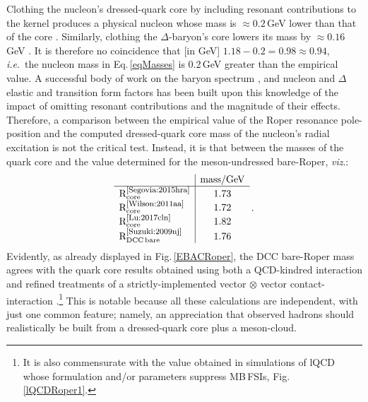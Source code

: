 Clothing the nucleon's dressed-quark core by including resonant contributions to the kernel produces a physical nucleon whose mass is $\approx 0.2$\,GeV lower than that of the core \cite{Ishii:1998tw, Hecht:2002ej, Chang:2009ae, Sanchis-Alepuz:2014wea}.  Similarly, clothing the $\Delta$-baryon's core lowers its mass by $\approx 0.16\,$GeV \cite{JuliaDiaz:2007kz}.   It is therefore no coincidence that [in GeV] $1.18-0.2 = 0.98\approx 0.94$, \emph{i.e}.\ the nucleon mass in Eq.\,\eqref{eqMasses} is 0.2\,GeV greater than the empirical value.  A successful body of work on the baryon spectrum \cite{Lu:2017cln}, and nucleon and $\Delta$ elastic and transition form factors \cite{Segovia:2014aza, Roberts:2015dea, Segovia:2016zyc} has been built upon this knowledge of the impact of omitting resonant contributions and the magnitude of their effects.  Therefore, a comparison between the empirical value of the Roper resonance pole-position and the computed dressed-quark core mass of the nucleon's radial excitation is not the critical test.  Instead, it is that between the masses of the quark core and the value determined for the meson-undressed bare-Roper, \emph{viz}.:
\begin{equation}
\label{eqMassesA}
\begin{array}{l|c}
    & \mbox{mass/GeV} \\\hline
\mbox{R}_{{\rm core}}^{\mbox{\footnotesize \cite{Segovia:2015hra}}} & 1.73\\
\mbox{R}_{{\rm core}}^{\mbox{\footnotesize \cite{Wilson:2011aa}}}   &  1.72\\
\mbox{R}_{{\rm core}}^{\mbox{\footnotesize \cite{Lu:2017cln}}}   &  1.82\\
\mbox{R}_{\rm DCC\,bare}^{\mbox{\footnotesize \cite{Suzuki:2009nj}}} & 1.76
\end{array}\,.
\end{equation}
Evidently, as already displayed in Fig.\,\ref{EBACRoper}, the DCC bare-Roper mass agrees with the quark core results obtained using both a QCD-kindred interaction \cite{Segovia:2015hra} and refined treatments of a strictly-implemented vector$\,\otimes\,$vector contact-interaction \cite{Wilson:2011aa, Lu:2017cln}.\footnote{It is also commensurate with the value obtained in simulations of lQCD whose formulation and/or parameters suppress MB\,FSIs, Fig.\,\ref{lQCDRoper1}.}  This is notable because all these calculations are independent, with just one common feature; namely, an appreciation that observed hadrons should realistically be built from a dressed-quark core plus a meson-cloud.


